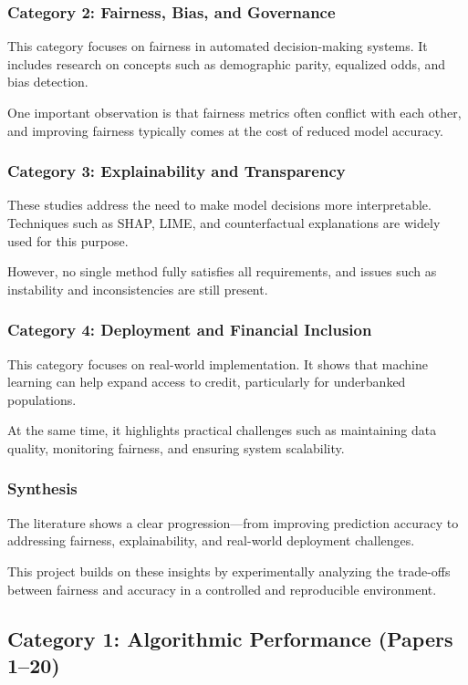 \subsubsection{Category 2: Fairness, Bias, and Governance}

This category focuses on fairness in automated decision-making systems. It includes research on concepts such as demographic parity, equalized odds, and bias detection.

One important observation is that fairness metrics often conflict with each other, and improving fairness typically comes at the cost of reduced model accuracy.

\subsubsection{Category 3: Explainability and Transparency}

These studies address the need to make model decisions more interpretable. Techniques such as SHAP, LIME, and counterfactual explanations are widely used for this purpose.

However, no single method fully satisfies all requirements, and issues such as instability and inconsistencies are still present.

\subsubsection{Category 4: Deployment and Financial Inclusion}

This category focuses on real-world implementation. It shows that machine learning can help expand access to credit, particularly for underbanked populations.

At the same time, it highlights practical challenges such as maintaining data quality, monitoring fairness, and ensuring system scalability.

\subsubsection{Synthesis}

The literature shows a clear progression—from improving prediction accuracy to addressing fairness, explainability, and real-world deployment challenges.

This project builds on these insights by experimentally analyzing the trade-offs between fairness and accuracy in a controlled and reproducible environment.
\subsection{Category 1: Algorithmic Performance (Papers 1--20)}

